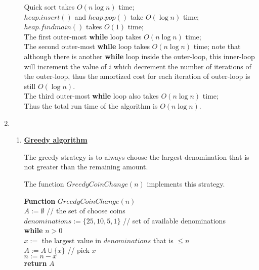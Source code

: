 \documentclass[11pt]{article}
\begin{document}
\begin{enumerate}
\begin{enumerate}
Quick sort takes $O(n\log n)$ time;\\
$heap.insert()$ and $heap.pop()$ take $O(\log n)$ time;\\
$heap.findmain()$ takes $O(1)$ time;\\
The first outer-most \textbf{while} loop takes $O(n\log n)$ time;\\
The second outer-most \textbf{while} loop takes $O(n\log n)$ time;
note that although there is another \textbf{while} loop inside the
outer-loop, this inner-loop will increment the value of $i$
which decrement the number of iterations of the outer-loop, thus the
amortized cost for each iteration of outer-loop is still $O(\log
n)$.\\
The third outer-most \textbf{while} loop also takes $O(n\log n)$ time;\\
Thus the total run time of the algorithm is $O(n\log n)$.

\end{enumerate}

\item %
\begin{enumerate}
\item \underline{\textbf{Greedy algorithm}}

The greedy strategy is to always choose the largest denomination that
is not greater than the remaining amount.

The function $GreedyCoinChange(n)$ implements this strategy.

\textbf{Function} $GreedyCoinChange(n)$\\
\-\hspace{3em} $A := \emptyset$ // the set of choose coins \\
\-\hspace{3em} $denominations := \{25,10,5,1\}$ // set of
available denominations \\
\-\hspace{3em} \textbf{while} $n > 0$\\
\-\hspace{5em} $x := $ the largest value in $denominations$ that is
$\leq n$ \\
\-\hspace{5em} $A := A \cup \{x\}$ // pick $x$\\
\-\hspace{5em} $n := n - x$\\
\-\hspace{3em} \textbf{return} $A$\\


\end{enumerate}
\end{enumerate}
\end{document}
